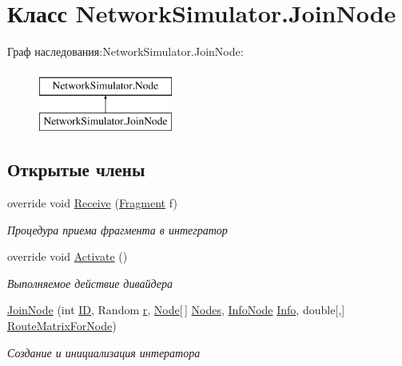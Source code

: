 \hypertarget{class_network_simulator_1_1_join_node}{}\section{Класс Network\+Simulator.\+Join\+Node}
\label{class_network_simulator_1_1_join_node}
Граф наследования\+:Network\+Simulator.\+Join\+Node\+:\begin{figure}[H]
\begin{center}
\leavevmode
\includegraphics[height=2.000000cm]{class_network_simulator_1_1_join_node}
\end{center}
\end{figure}
\subsection*{Открытые члены}
\begin{DoxyCompactItemize}
\item 
override void \hyperlink{class_network_simulator_1_1_join_node_a32dc54853db194d6647d15b795981744}{Receive} (\hyperlink{class_network_simulator_1_1_fragment}{Fragment} f)
\begin{DoxyCompactList}\small\item\em Процедура приема фрагмента в интегратор \end{DoxyCompactList}\item 
override void \hyperlink{class_network_simulator_1_1_join_node_ab383bfff6a85c0963af158e9af6c574b}{Activate} ()
\begin{DoxyCompactList}\small\item\em Выполняемое действие дивайдера \end{DoxyCompactList}\item 
\hyperlink{class_network_simulator_1_1_join_node_a57e5c5715308e75fd446e1152d7b079d}{Join\+Node} (int \hyperlink{class_network_simulator_1_1_node_a1ba068212f50babe026c527a9b5fb55a}{ID}, Random \hyperlink{class_network_simulator_1_1_node_a3eb74310ed895ee8ec49c1850c1c405e}{r}, \hyperlink{class_network_simulator_1_1_node}{Node}\mbox{[}$\,$\mbox{]} \hyperlink{class_network_simulator_1_1_node_abae5930cce02aa93551aefe417b23fa0}{Nodes}, \hyperlink{class_network_simulator_1_1_info_node}{Info\+Node} \hyperlink{class_network_simulator_1_1_node_a63e706d7158c6ea84ea8fdbe61d9bffb}{Info}, double\mbox{[},\mbox{]} \hyperlink{class_network_simulator_1_1_join_node_a7db66d213f0ee75aef3d52bd0d6e5be2}{Route\+Matrix\+For\+Node})
\begin{DoxyCompactList}\small\item\em Создание и инициализация интератора \end{DoxyCompactList}\end{DoxyCompactItemize}
